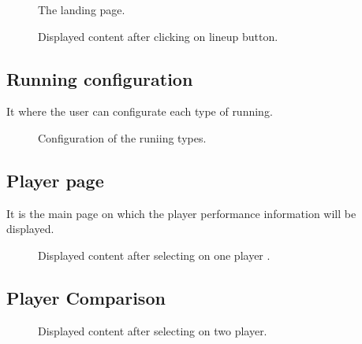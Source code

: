 \documentclass[letterpaper,10pt,english]{jupyterBook}
\begin{document}
\begin{figure}[htbp]
\centering
\capstart

\noindent{}
\caption{The landing page.}\label{\detokenize{Chap3/Chap3:landingpage-fig}}\end{figure}

\begin{figure}[htbp]
\centering
\capstart

\noindent{}
\caption{Displayed content after clicking on line\sphinxhyphen{}up button.}\label{\detokenize{Chap3/Chap3:lineuppage-fig}}\end{figure}


\subsection{Running configuration}
\label{\detokenize{Chap3/Chap3:running-configuration}}
\sphinxAtStartPar
It where the user can configurate each type of running.

\begin{figure}[htbp]
\centering
\capstart

\noindent{}
\caption{Configuration of the runiing types.}\label{\detokenize{Chap3/Chap3:config-fig}}\end{figure}


\subsection{Player page}
\label{\detokenize{Chap3/Chap3:player-page}}
\sphinxAtStartPar
It is the main page on which the player performance information will be displayed.

\begin{figure}[htbp]
\centering
\capstart

\noindent{}
\caption{Displayed content after selecting on one player .}\label{\detokenize{Chap3/Chap3:playerpage-fig}}\end{figure}


\subsection{Player Comparison}
\label{\detokenize{Chap3/Chap3:player-comparison}}
\begin{figure}[htbp]
\centering
\capstart

\noindent{}
\caption{Displayed content after selecting on two player.}\label{\detokenize{Chap3/Chap3:playercomp-fig}}\end{figure}
\end{document}
